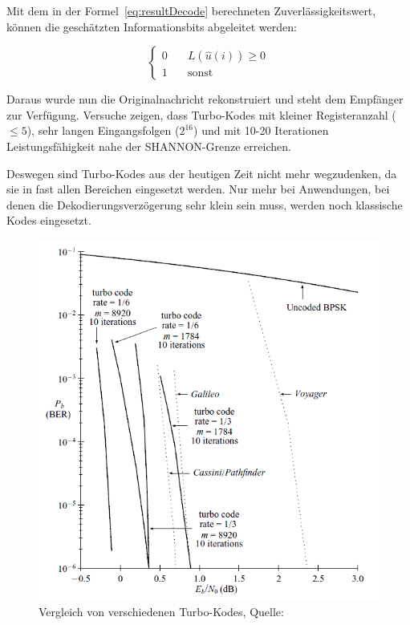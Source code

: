 Mit dem in der Formel~\ref{eq:resultDecode} berechneten Zuverlässigkeitswert, können die geschätzten Informationsbits abgeleitet werden:

\begin{equation*}
\begin{cases}
0 & \quad L(\widehat{u}(i)) \geq 0 \\
1 & \quad \text{sonst}
\end{cases}
\end{equation*}

Daraus wurde nun die Originalnachricht rekonstruiert und steht dem Empfänger zur Verfügung. Versuche zeigen, dass Turbo-Kodes mit kleiner Registeranzahl ($\leq 5$), sehr langen Eingangsfolgen ($2^{16}$) und mit 10-20 Iterationen Leistungsfähigkeit nahe der SHANNON-Grenze erreichen. \cite[265]{schoenfeld2012informations}

Deswegen sind Turbo-Kodes aus der heutigen Zeit nicht mehr wegzudenken, da sie in fast allen Bereichen eingesetzt werden. Nur mehr bei Anwendungen, bei denen die Dekodierungsverzögerung sehr klein sein muss, werden noch klassische Kodes eingesetzt.

\begin{figure}[th]
\centering
\includegraphics[width=\ScaleIfNeeded]{pictures/ComparisonTurbo}
\caption{Vergleich von verschiedenen Turbo-Kodes, Quelle: \cite[603]{huffman2010fundamentals}}
\label{pic:comparisonTurbo}
\end{figure}

